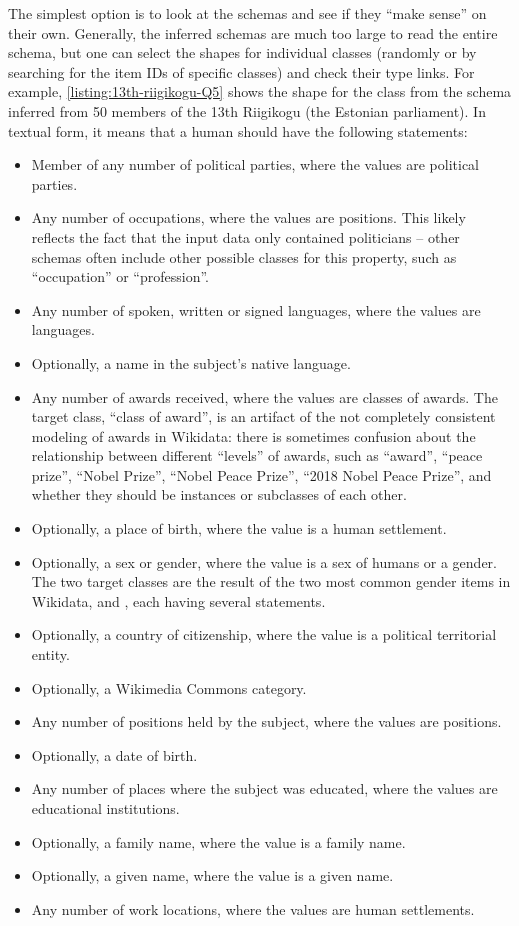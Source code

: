 The simplest option is to look at the schemas and see if they “make sense” on their own.
Generally, the inferred schemas are much too large to read the entire schema,
but one can select the shapes for individual classes
(randomly or by searching for the item IDs of specific classes)
and check their type links.
For example, \cref{listing:13th-riigikogu-Q5} shows the shape for the class 
from the schema inferred from 50 members of the 13th Riigikogu (the Estonian parliament).
In textual form, it means that a human should have the following statements:
\begin{itemize}
\item Member of any number of political parties, where the values are political parties.
\item Any number of occupations, where the values are positions.
  This likely reflects the fact that the input data only contained politicians –
  other schemas often include other possible classes for this property,
  such as “occupation” or “profession”.
\item Any number of spoken, written or signed languages, where the values are languages.
\item Optionally, a name in the subject’s native language.
\item Any number of awards received, where the values are classes of awards.
  The target class, “class of award”, is an artifact of the not completely consistent modeling of awards in Wikidata:
  there is sometimes confusion about the relationship between different “levels” of awards,
  such as “award”, “peace prize”, “Nobel Prize”, “Nobel Peace Prize”, “2018 Nobel Peace Prize”,
  and whether they should be instances or subclasses of each other.
\item Optionally, a place of birth, where the value is a human settlement.
\item Optionally, a sex or gender, where the value is a sex of humans or a gender.
  The two target classes are the result of the two most common gender items in Wikidata,
   and ,
  each having several  statements.
\item Optionally, a country of citizenship, where the value is a political territorial entity.
\item Optionally, a Wikimedia Commons category.
\item Any number of positions held by the subject, where the values are positions.
\item Optionally, a date of birth.
\item Any number of places where the subject was educated, where the values are educational institutions.
\item Optionally, a family name, where the value is a family name.
\item Optionally, a given name, where the value is a given name.
\item Any number of work locations, where the values are human settlements.
\end{itemize}

